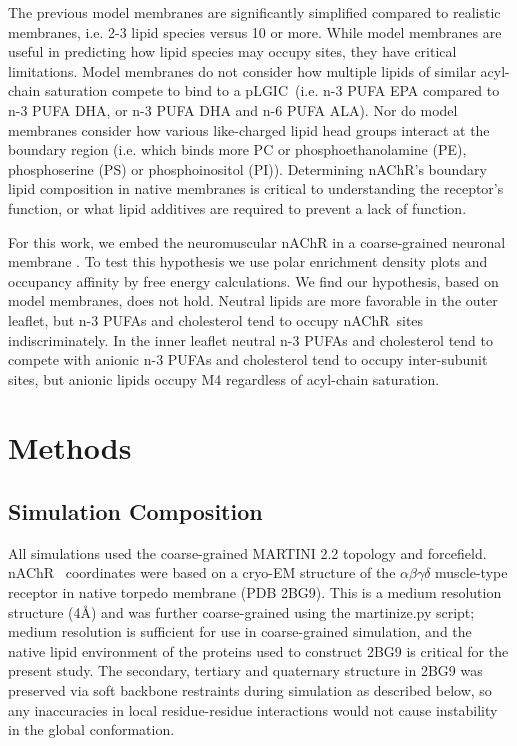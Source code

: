 \documentclass[preprint,3p,9pt,times,onecolumn]{elsarticle}
\newcommand{\nachr}{nAChR}
\newcommand{\plgic}{pLGIC}
\begin{document}
The previous model membranes are significantly simplified compared to realistic membranes, i.e. 2-3 lipid species versus 10 or more. While model membranes are useful in predicting how lipid species may occupy sites, they have critical limitations. Model membranes do not consider how multiple lipids of similar acyl-chain saturation compete to bind to a \plgic~(i.e. n-3 PUFA EPA compared to n-3 PUFA DHA, or n-3 PUFA DHA and n-6 PUFA ALA). Nor do model membranes consider how various like-charged lipid head groups interact at the boundary region (i.e. which binds more PC or phosphoethanolamine (PE), phosphoserine (PS) or phosphoinositol (PI)). Determining \nachr's boundary lipid composition in native membranes is critical to understanding the receptor's function, or what lipid additives are required to prevent a lack of function.

For this work, we embed the neuromuscular \nachr\cite{Unwin2005} in a coarse-grained neuronal membrane \cite{Ingolfsson2017b}. To test this hypothesis we use polar enrichment density plots and occupancy affinity by free energy calculations. We find our hypothesis, based on model membranes, does not hold. Neutral lipids are more favorable in the outer leaflet, but n-3 PUFAs and cholesterol tend to occupy \nachr~sites indiscriminately. In the inner leaflet neutral n-3 PUFAs and cholesterol tend to compete with anionic n-3 PUFAs and cholesterol tend to occupy inter-subunit sites, but anionic lipids occupy M4 regardless of acyl-chain saturation. 

\section{Methods}
\label{lab}

\subsection{Simulation Composition}
All simulations used the coarse-grained MARTINI 2.2\cite{DeJong2012} topology and forcefield.
\nachr~ coordinates were based on a cryo-EM structure of the $\alpha{\beta}\gamma\delta$ muscle-type receptor in native torpedo membrane (PDB 2BG9\cite{Unwin2005}). This is a medium resolution structure (4\AA) and was further coarse-grained using the martinize.py script; medium resolution is sufficient for use in coarse-grained simulation, and the native lipid environment of the proteins used to construct 2BG9 is critical for the present study. The secondary, tertiary and quaternary structure in 2BG9 was preserved via soft backbone restraints during simulation as described below, so any inaccuracies in local residue-residue interactions would not cause instability in the global conformation.  
\end{document}
